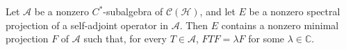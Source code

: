 Let $\mathcal{A}$ be a nonzero $C^*$-subalgebra of $\mathcal{C}(\mathcal{H})$, and let $E$ be a nonzero spectral projection of a self-adjoint operator in $\mathcal{A}$. Then $E$ contains a nonzero minimal projection $F$ of $\mathcal{A}$ such that, for every $T \in \mathcal{A}$, $FTF = \lambda F$ for some $\lambda \in \mathbb{C}$.
